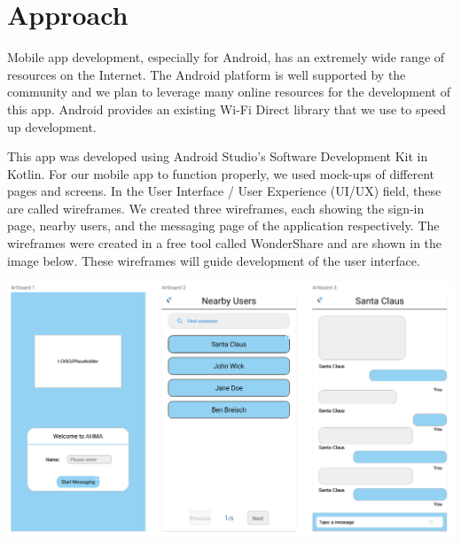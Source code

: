 \documentclass[10pt]{article}
\begin{document}

\section{Approach} %

Mobile app development, especially for Android, has an extremely wide range of resources on the Internet. The Android platform is well supported by the community and we plan to leverage many online resources for the development of this app. Android provides an existing Wi-Fi Direct library that we use to speed up development.

This app was developed using Android Studio's Software Development Kit in Kotlin. For our mobile app to function properly, we used mock-ups of different pages and screens. In the User Interface / User Experience (UI/UX) field, these are called wireframes. We created three wireframes, each showing the sign-in page, nearby users, and the messaging page of the application respectively. The wireframes were created in a free tool called WonderShare and are shown in the image below. These wireframes will guide development of the user interface.


\begin{center}
    \includegraphics[scale=0.5]{wireframe.png} \\
\end{center}
\end{document}
